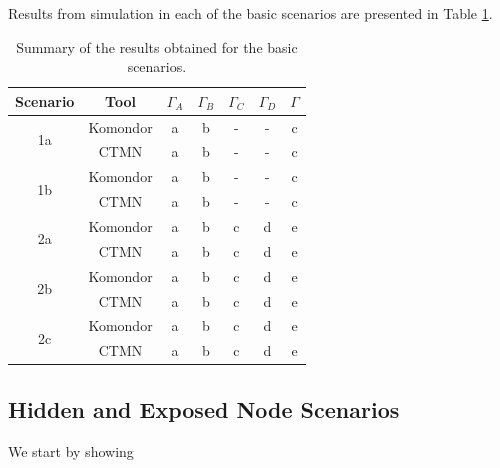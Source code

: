 \documentclass[a4paper]{article}
\begin{document}
	Results from simulation in each of the basic scenarios are presented in Table \ref{table:basic_scenarios}.
	\begin{table}[h!]
		\centering
		\begin{tabular}{|c|c|c|c|c|c|c|}
			\hline
			\textbf{Scenario} & \textbf{Tool} & $\Gamma_A$ & $\Gamma_B$ & $\Gamma_C$ & $\Gamma_D$ & $\Gamma$ \\ \hline
			\multirow{2}{*}{1a} & Komondor & a & b & - & - & c \\ \cline{2-7} 
			& CTMN & a & b & - & - & c \\ \hline
			\multirow{2}{*}{1b} & Komondor & a & b & - & - & c \\ \cline{2-7} 
			& CTMN & a & b & - & - & c \\ \hline
			\multirow{2}{*}{2a} & Komondor & a & b & c & d & e \\ \cline{2-7} 
			& CTMN & a & b & c & d & e \\ \hline
			\multirow{2}{*}{2b} & Komondor & a & b & c & d & e \\ \cline{2-7} 
			& CTMN & a & b & c & d & e \\ \hline
			\multirow{2}{*}{2c} & Komondor & a & b & c & d & e \\ \cline{2-7} 
			& CTMN & a & b & c & d & e \\ \hline
		\end{tabular}
		\caption{Summary of the results obtained for the basic scenarios.}
		\label{table:basic_scenarios}
	\end{table}	
	
	\subsection{Hidden and Exposed Node Scenarios}
	\label{section:validations_hidden_exposed}
	We start by showing 
	
\end{document}
